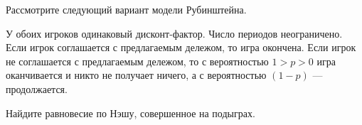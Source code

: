 \begin{problem}
 Рассмотрите следующий вариант модели Рубинштейна. \par %
У обоих игроков одинаковый дисконт-фактор. Число периодов
неограничено. Если игрок соглашается с предлагаемым дележом, то
игра окончена. Если игрок не соглашается с предлагаемым дележом,
то с вероятностью $1>p>0$ игра оканчивается и никто не получает
ничего, а с вероятностью $(1-p)$ — продолжается. \par
Найдите равновесие по Нэшу, совершенное на подыграх.



\begin{sol}

\end{sol}
\end{problem}




